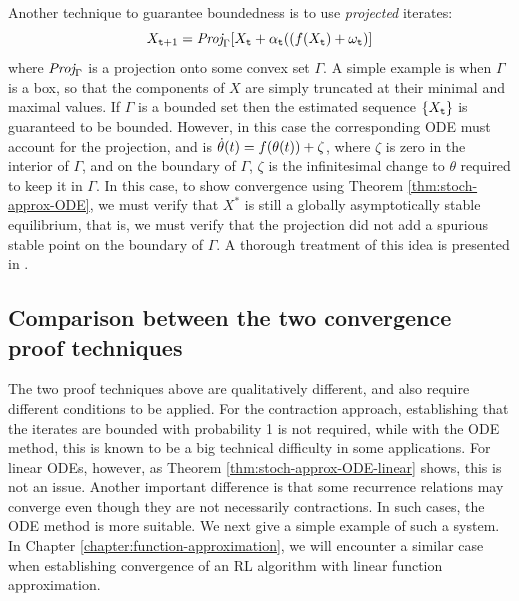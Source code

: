 \begin{remark}
Another technique to guarantee boundedness
is to use \textit{projected} iterates:
$$
X_{{\tt t}+1} = \text{\it Proj}_\Gamma [X_{\tt t}+\alpha_{\tt t}((f(X_{\tt t})+\omega_{\tt t}) ]
$$
where $\text{\it Proj}_\Gamma$ is a projection onto some convex set $\Gamma$.
A simple example is when $\Gamma$ is a box, so that the components of $X$ are simply truncated at their minimal and maximal values. 
If $\Gamma$ is a bounded set then the estimated sequence $\{X_{\tt t}\}$ is guaranteed
to be bounded. However, in this case the corresponding ODE must account for the projection, and is $\dot \theta(t) = f(\theta(t)) + \zeta$, where $\zeta$ is zero in the interior of $\Gamma$, and on the boundary of $\Gamma$, $\zeta$ is the infinitesimal change to $\theta$ required to keep it in $\Gamma$. In this case, to show convergence using Theorem \ref{thm:stoch-approx-ODE}, we must verify that $X^*$ is still a globally asymptotically stable equilibrium, that is, we must verify that the projection did not add a spurious stable point on the boundary of $\Gamma$. A thorough treatment of this idea is presented in \cite{kushner2003stochastic}.
\end{remark}


\subsection{Comparison between the two convergence proof techniques}

The two proof techniques above are qualitatively different, and also require different conditions to be applied. For the contraction approach, establishing that the iterates are bounded with probability 1 is not required, while with the ODE method, this is known to be a big technical difficulty in some applications. For linear ODEs, however, as Theorem \ref{thm:stoch-approx-ODE-linear} shows, this is not an issue. Another important difference is that some recurrence relations may converge even though they are not necessarily contractions. In such cases, the ODE method is more suitable. We next give a simple example of such a system. In Chapter \ref{chapter:function-approximation}, we will encounter a similar case when establishing convergence of an RL algorithm with linear function approximation.

